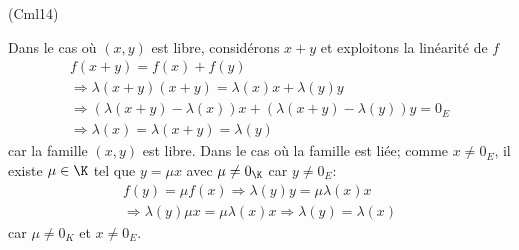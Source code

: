 \begin{tiny}(Cml14)\end{tiny} Dans le cas où $(x,y)$ est libre, considérons $x+y$ et exploitons la linéarité de $f$
\begin{multline*}
  f(x+y)=f(x) + f(y)\\
\Rightarrow \lambda(x+y)(x+y) = \lambda(x) x + \lambda(y) y\\
\Rightarrow \left( \lambda(x+y) -\lambda(x)\right) x + \left( \lambda(x+y) -\lambda(y)\right) y = 0_E \\
\Rightarrow \lambda(x) = \lambda(x+y) = \lambda(y)
\end{multline*}
car la famille $(x,y)$ est libre.\newline
Dans le cas où la famille est liée; comme $x \neq 0_E$, il existe $\mu \in \K$ tel que $y=\mu x$ avec $\mu \neq 0_\K$ car $y \neq 0_E$:
\begin{multline*}
  f(y) = \mu f(x)
\Rightarrow \lambda(y) y = \mu \lambda(x)x \\
\Rightarrow \lambda(y) \mu x = \mu \lambda(x) x
\Rightarrow \lambda(y) = \lambda(x)
\end{multline*}
car $\mu \neq 0_K$ et $x\neq 0_E$.